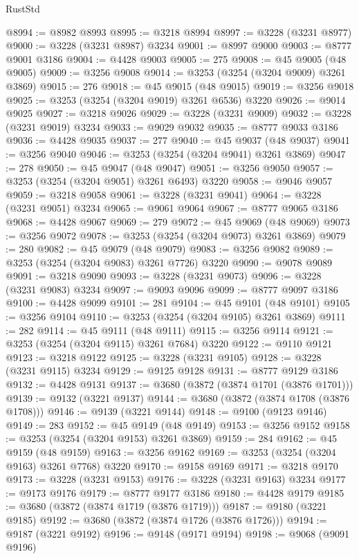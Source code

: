 \begin{lexlean}{RustStd}
\begin{coremodule}
{\begin{coremodule}
{{{{{{{{{{{{{{{{{{{{{{{{{{{{{{{{{{{{{@8994 := @8982 @8993
@8995 := @3218 @8994
@8997 := @3228 (@3231 @8977)
@9000 := @3228 (@3231 @8987) @3234
@9001 := @8997 @9000
@9003 := @8777 @9001 @3186
@9004 := @4428 @9003
@9005 := 275
@9008 := @45 @9005 (@48 @9005)
@9009 := @3256 @9008
@9014 := @3253 (@3254 (@3204 @9009) @3261 @3869)
@9015 := 276
@9018 := @45 @9015 (@48 @9015)
@9019 := @3256 @9018
@9025 := @3253 (@3254 (@3204 @9019) @3261 @6536) @3220
@9026 := @9014 @9025
@9027 := @3218 @9026
@9029 := @3228 (@3231 @9009)
@9032 := @3228 (@3231 @9019) @3234
@9033 := @9029 @9032
@9035 := @8777 @9033 @3186
@9036 := @4428 @9035
@9037 := 277
@9040 := @45 @9037 (@48 @9037)
@9041 := @3256 @9040
@9046 := @3253 (@3254 (@3204 @9041) @3261 @3869)
@9047 := 278
@9050 := @45 @9047 (@48 @9047)
@9051 := @3256 @9050
@9057 := @3253 (@3254 (@3204 @9051) @3261 @6493) @3220
@9058 := @9046 @9057
@9059 := @3218 @9058
@9061 := @3228 (@3231 @9041)
@9064 := @3228 (@3231 @9051) @3234
@9065 := @9061 @9064
@9067 := @8777 @9065 @3186
@9068 := @4428 @9067
@9069 := 279
@9072 := @45 @9069 (@48 @9069)
@9073 := @3256 @9072
@9078 := @3253 (@3254 (@3204 @9073) @3261 @3869)
@9079 := 280
@9082 := @45 @9079 (@48 @9079)
@9083 := @3256 @9082
@9089 := @3253 (@3254 (@3204 @9083) @3261 @7726) @3220
@9090 := @9078 @9089
@9091 := @3218 @9090
@9093 := @3228 (@3231 @9073)
@9096 := @3228 (@3231 @9083) @3234
@9097 := @9093 @9096
@9099 := @8777 @9097 @3186
@9100 := @4428 @9099
@9101 := 281
@9104 := @45 @9101 (@48 @9101)
@9105 := @3256 @9104
@9110 := @3253 (@3254 (@3204 @9105) @3261 @3869)
@9111 := 282
@9114 := @45 @9111 (@48 @9111)
@9115 := @3256 @9114
@9121 := @3253 (@3254 (@3204 @9115) @3261 @7684) @3220
@9122 := @9110 @9121
@9123 := @3218 @9122
@9125 := @3228 (@3231 @9105)
@9128 := @3228 (@3231 @9115) @3234
@9129 := @9125 @9128
@9131 := @8777 @9129 @3186
@9132 := @4428 @9131
@9137 := @3680 (@3872 (@3874 @1701 (@3876 @1701)))
@9139 := @9132 (@3221 @9137)
@9144 := @3680 (@3872 (@3874 @1708 (@3876 @1708)))
@9146 := @9139 (@3221 @9144)
@9148 := @9100 (@9123 @9146)
@9149 := 283
@9152 := @45 @9149 (@48 @9149)
@9153 := @3256 @9152
@9158 := @3253 (@3254 (@3204 @9153) @3261 @3869)
@9159 := 284
@9162 := @45 @9159 (@48 @9159)
@9163 := @3256 @9162
@9169 := @3253 (@3254 (@3204 @9163) @3261 @7768) @3220
@9170 := @9158 @9169
@9171 := @3218 @9170
@9173 := @3228 (@3231 @9153)
@9176 := @3228 (@3231 @9163) @3234
@9177 := @9173 @9176
@9179 := @8777 @9177 @3186
@9180 := @4428 @9179
@9185 := @3680 (@3872 (@3874 @1719 (@3876 @1719)))
@9187 := @9180 (@3221 @9185)
@9192 := @3680 (@3872 (@3874 @1726 (@3876 @1726)))
@9194 := @9187 (@3221 @9192)
@9196 := @9148 (@9171 @9194)
@9198 := @9068 (@9091 @9196)
}}}}}}}}}}}}}}}}}}}}}}}}}}}}}}}}}}}}}
\end{coremodule}}
\end{coremodule}
\end{lexlean}
